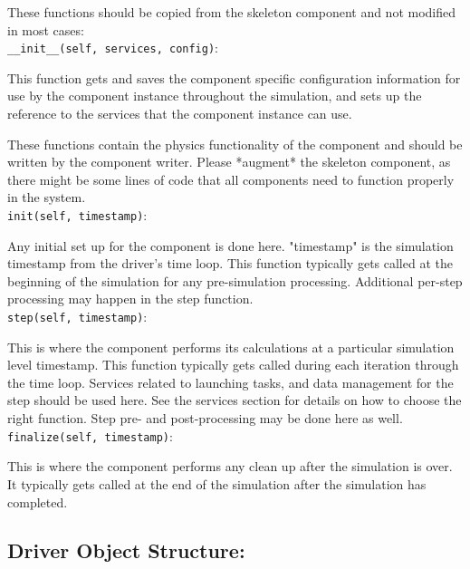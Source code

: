 These functions should be copied from the skeleton component and not 
modified in most cases:\\

\texttt{\_\_init\_\_(self, services, config)}:
\par
  This function gets and saves the component specific configuration
  information for use by the component instance throughout the simulation,
  and sets up the reference to the services that the component instance can
  use.

\par
These functions contain the physics functionality of the component and 
should be written by the component writer.  Please *augment* the skeleton 
component, as there might be some lines of code that all components need to 
function properly in the system.\\

\texttt{init(self, timestamp)}:
\par Any initial set up for the component is done here.  "timestamp" is the
  simulation timestamp from the driver's time loop.  This function 
  typically gets called at the beginning of the simulation for any 
  pre-simulation processing.  Additional per-step processing may happen in 
  the step function.\\

\texttt{step(self, timestamp)}:
\par
  This is where the component performs its calculations at a particular
  simulation level timestamp.  This function typically gets called during
  each iteration through the time loop. Services related to launching 
  tasks, and data management for the step should be used here.  See the 
  services section for details on how to choose the right function.  Step 
  pre- and post-processing may be done here as well.\\

\texttt{finalize(self, timestamp)}:
\par
  This is where the component performs any clean up after the simulation is
  over.  It typically gets called at the end of the simulation after the 
  simulation has completed.

\subsection{Driver Object Structure:}
\label{sec:driver_struct}

